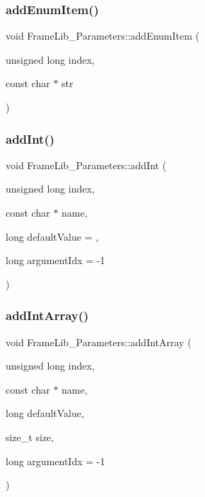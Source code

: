 \subsubsection{\texorpdfstring{add\+Enum\+Item()}{addEnumItem()}}
{\footnotesize\ttfamily void Frame\+Lib\+\_\+\+Parameters\+::add\+Enum\+Item (\begin{DoxyParamCaption}\item[{unsigned long}]{index,  }\item[{const char $\ast$}]{str }\end{DoxyParamCaption})\hspace{0.3cm}{\ttfamily [inline]}}

\mbox{\label{class_frame_lib___parameters_a9cb86d9fa829686a58e7776dcc45b60a}} 
\subsubsection{\texorpdfstring{add\+Int()}{addInt()}}
{\footnotesize\ttfamily void Frame\+Lib\+\_\+\+Parameters\+::add\+Int (\begin{DoxyParamCaption}\item[{unsigned long}]{index,  }\item[{const char $\ast$}]{name,  }\item[{long}]{default\+Value = {},  }\item[{long}]{argument\+Idx = {\ttfamily -\/1} }\end{DoxyParamCaption})\hspace{0.3cm}{\ttfamily [inline]}}

\mbox{\label{class_frame_lib___parameters_a409ad961a1376b59eb9927894ee08d35}} 
\subsubsection{\texorpdfstring{add\+Int\+Array()}{addIntArray()}}
{\footnotesize\ttfamily void Frame\+Lib\+\_\+\+Parameters\+::add\+Int\+Array (\begin{DoxyParamCaption}\item[{unsigned long}]{index,  }\item[{const char $\ast$}]{name,  }\item[{long}]{default\+Value,  }\item[{size\+\_\+t}]{size,  }\item[{long}]{argument\+Idx = {\ttfamily -\/1} }\end{DoxyParamCaption})\hspace{0.3cm}{\ttfamily [inline]}}

